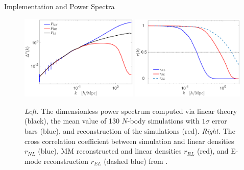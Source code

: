 \begin{section}{Implementation and Power Spectra}
  \begin{figure}
    \centering
    \includegraphics[width=0.5\textwidth]{fig2a.pdf}
    \includegraphics[width=0.485\textwidth]{fig2b.pdf}
    \caption{{\it Left.} The dimensionless power spectrum computed via
      linear theory (black), the mean value of 130 $N$-body
      simulations with $1\sigma$ error bars (blue), and reconstruction
      of the simulations (red).  {\it Right.} The cross correlation
      coefficient between simulation and linear densities $r_{NL}$ (blue),
      MM reconstructed and linear densities $r_{RL}$ (red), and E-mode reconstruction $r_{EL}$ (dashed
      blue) from \citet{bib:Yu2016}.}
    \label{fig:cp}
  \end{figure}


\end{section}

